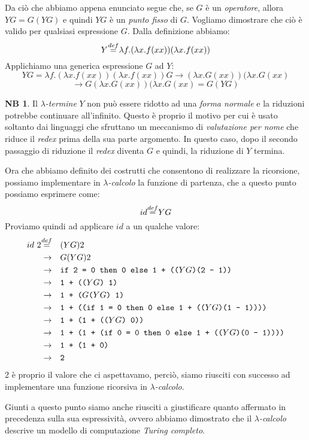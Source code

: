 \documentclass[12pt, a4paper]{report}
\theoremstyle{definition}
\newtheorem*{note}{NB}
\newcommand{\code}[1]{\texttt{#1}}
\newcommand{\mydef}{\stackrel{\mathclap{\normalfont{def}}}{=}}
\begin{document}
Da ciò che abbiamo appena enunciato segue che, se $G$ è un \emph{operatore}, allora
\(YG=G(YG)\) e quindi \(YG\) è un \emph{punto fisso} di $G$. Vogliamo dimostrare
che ciò è valido per qualsiasi espressione $G$.
Dalla definizione abbiamo:
\[Y\mydef\lambda f.(\lambda x.f(xx))(\lambda x.f(xx))\]
Applichiamo una generica espressione $G$ ad $Y$:
\[YG=\lambda f.(\lambda x.f(xx))(\lambda x.f(xx))G\to
(\lambda x.G(xx))(\lambda x.G(xx)\]
\[\to G(\lambda x.G(xx))(\lambda x.G(xx)=G(YG)\]

\begin{note}
    Il \emph{$\lambda$-termine} $Y$ non può essere ridotto ad una \emph{forma
    normale} e la riduzioni potrebbe continuare all'infinito. Questo è proprio il
    motivo per cui è usato soltanto dai linguaggi che sfruttano un meccanismo di
    \emph{valutazione per nome} che riduce il \emph{redex} prima della sua parte
    argomento. In questo caso, dopo il secondo passaggio di riduzione il
    \emph{redex} diventa $G$ e quindi, la riduzione di $Y$ termina.
\end{note}

Ora che abbiamo definito dei costrutti che consentono di realizzare la ricorsione,
possiamo implementare in \emph{$\lambda$-calcolo} la funzione di partenza, che a
questo punto possiamo esprimere come:
\[id\mydef YG\]
Proviamo quindi ad applicare \(id\) a un qualche valore:
\[\begin{aligned}
    id\ 2   &\mydef && (YG)2\\
            &\to && G(YG)2\\
            &\to && \code{if 2 = 0 then 0 else 1 + (($YG$)(2 - 1))}\\
            &\to && \code{1 + (($YG$) 1)}\\
            &\to && \code{1 + ($G$($YG$) 1)}\\
            &\to && \code{1 + ((if 1 = 0 then 0 else 1 + (($YG$)(1 - 1))))}\\
            &\to && \code{1 + (1 + (($YG$) 0))}\\
            &\to && \code{1 + (1 + (if 0 = 0 then 0 else 1 + (($YG$)(0 - 1))))}\\
            &\to && \code{1 + (1 + 0)}\\
            &\to && \code{2}
\end{aligned}\]
2 è proprio il valore che ci aspettavamo, perciò, siamo riusciti con successo ad
implementare una funzione ricorsiva in \emph{$\lambda$-calcolo}.

Giunti a questo punto siamo anche riusciti a giustificare quanto affermato in
precedenza sulla sua espressività, ovvero abbiamo dimostrato che il
\emph{$\lambda$-calcolo} descrive un modello di computazione \emph{Turing completo}.
\end{document}
